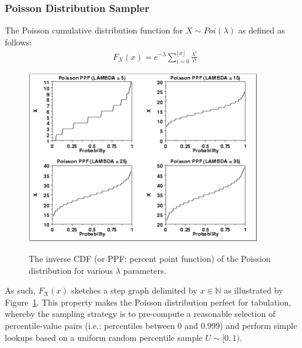 \subsubsection{Poisson Distribution Sampler}

The Poisson cumulative distribution function for $X \sim Poi(\lambda)$ as defined as follows:
\begin{align*}
    F_X(x) = e^{-\lambda} \sum_{i=0}^{\lfloor x \rfloor} \frac{\lambda^i}{i!}
\end{align*}

\begin{figure}[!h] {
    \includegraphics[width=0.9\textwidth]{images/chapter_3_design/poisson_percent_point_function}
    \centering~\caption{The inverse CDF (or PPF: percent point function) of the Poission distribution for various
        $\lambda$ parameters\cite{engineering_statistics_handbook_poisson_distribution}.}
    \label{fig:chapter_3_design-poisson_percent_point_function}
}
\end{figure}

As such, $F_X(x)$ sketches a step graph delimited by $x \in \mathbb{N}$ as illustrated by
Figure~\ref{fig:chapter_3_design-poisson_percent_point_function}. This property makes the Poisson distribution
perfect for tabulation, whereby the sampling strategy is to pre-compute a reasonable selection of percentile-value
pairs (i.e.: percentiles between 0 and 0.999) and perform simple lookups based on a uniform random percentile sample
$U \sim [0, 1)$.

\newpage

